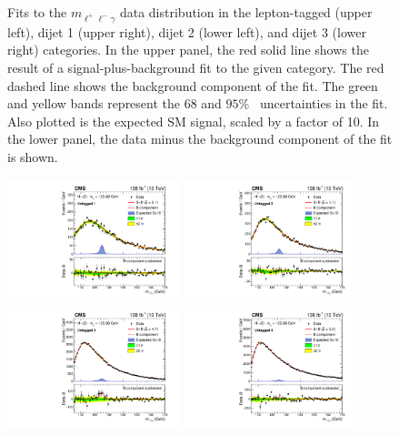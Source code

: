 \begin{figure}
   \caption{Fits to the $m_{\ell^+\ell^-\gamma}$ data distribution
    in the lepton-tagged (upper left), dijet 1 (upper right), dijet 2 (lower left), and
  dijet 3 (lower right) categories.
  In the upper panel, the red solid line shows the result of a signal-plus-background fit to the given category.
  The red dashed line shows the background component of the fit.
  The green and yellow bands represent the $68$ and $95$\% \CL\ uncertainties in the fit.
  Also plotted is the expected SM signal, scaled by a factor of 10.
  In the lower panel, the data minus the background component of the fit is shown. \label{fig:3}}
  \end{figure}

  \begin{figure}
  \centering
  \includegraphics[width=0.45\textwidth]{fig/results/Figure_006-a.pdf}
  \includegraphics[width=0.45\textwidth]{fig/results/Figure_006-b.pdf}\\
  \includegraphics[width=0.45\textwidth]{fig/results/Figure_006-c.pdf}
  \includegraphics[width=0.45\textwidth]{fig/results/Figure_006-d.pdf}

\end{figure}
